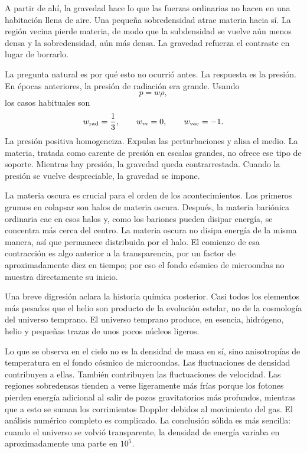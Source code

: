 A partir de ahí, la gravedad hace lo que las fuerzas ordinarias no hacen en una habitación llena de aire. Una pequeña sobredensidad atrae materia hacia sí. La región vecina pierde materia, de modo que la subdensidad se vuelve aún menos densa y la sobredensidad, aún más densa. La gravedad refuerza el contraste en lugar de borrarlo.

La pregunta natural es por qué esto no ocurrió antes. La respuesta es la presión. En épocas anteriores, la presión de radiación era grande. Usando
\begin{equation}
p=w\rho,
\end{equation}
los casos habituales son
\begin{equation}
w_{\rm rad}=\frac13,\qquad
w_m=0,\qquad
w_{\rm vac}=-1.
\end{equation}
La presión positiva homogeneiza. Expulsa las perturbaciones y alisa el medio. La materia, tratada como carente de presión en escalas grandes, no ofrece ese tipo de soporte. Mientras hay presión, la gravedad queda contrarrestada. Cuando la presión se vuelve despreciable, la gravedad se impone.

La materia oscura es crucial para el orden de los acontecimientos. Los primeros grumos en colapsar son halos de materia oscura. Después, la materia bariónica ordinaria cae en esos halos y, como los bariones pueden disipar energía, se concentra más cerca del centro. La materia oscura no disipa energía de la misma manera, así que permanece distribuida por el halo. El comienzo de esa contracción es algo anterior a la transparencia, por un factor de aproximadamente diez en tiempo; por eso el fondo cósmico de microondas no muestra directamente su inicio.

Una breve digresión aclara la historia química posterior. Casi todos los elementos más pesados que el helio son producto de la evolución estelar, no de la cosmología del universo temprano. El universo temprano produce, en esencia, hidrógeno, helio y pequeñas trazas de unos pocos núcleos ligeros.

Lo que se observa en el cielo no es la densidad de masa en sí, sino anisotropías de temperatura en el fondo cósmico de microondas. Las fluctuaciones de densidad contribuyen a ellas. También contribuyen las fluctuaciones de velocidad. Las regiones sobredensas tienden a verse ligeramente más frías porque los fotones pierden energía adicional al salir de pozos gravitatorios más profundos, mientras que a esto se suman los corrimientos Doppler debidos al movimiento del gas. El análisis numérico completo es complicado. La conclusión sólida es más sencilla: cuando el universo se volvió transparente, la densidad de energía variaba en aproximadamente una parte en \(10^5\).

